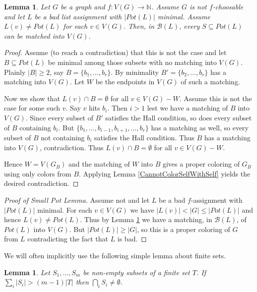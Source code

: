 \documentclass[12pt]{article}
\theoremstyle{plain}
\newtheorem{lem}[thm]{Lemma}
\theoremstyle{definition}
\theoremstyle{remark}
\newcommand{\fancy}[1]{\mathcal{#1}}
\begin{document}
\begin{lem}\label{MinPotCondition}
Let $G$ be a graph and $f\colon V(G) \rightarrow \mathbb{N}$.  Assume $G$ is not $f$-choosable and let $L$ be a bad list assignment with $|Pot(L)|$ minimal. Assume $L(v) \neq Pot(L)$ for each $v \in V(G)$. Then, in $\fancy{B}(L)$, every $S \subseteq Pot(L)$ can be matched into $V(G)$.
\end{lem}
\begin{proof}
Assume (to reach a contradiction) that this is not the case and let $B \subseteq Pot(L)$ be minimal among those subsets with no matching into $V(G)$. Plainly $|B| \geq 2$, say $B = \{b_1, \ldots, b_r\}$.  By minimality $B' = \{b_2, \ldots, b_r\}$ has a matching into $V(G)$.  Let $W$ be the endpoints in $V(G)$ of such a matching.\newline

Now we show that $L(v) \cap B = \emptyset$ for all $v \in V(G) - W$.  Assume this is not the case for some such $v$.  Say $v$ hits $b_i$.  Then $i > 1$ lest we have a matching of $B$ into $V(G)$.  Since every subset of $B'$ satisfies the Hall condition, so does every subset of $B$ containing $b_i$.  But $\{b_1, \ldots, b_{i-1}, b_{i+1}, ..., b_r\}$ has a matching as well, so every subset of $B$ not containing $b_i$ satisfies the Hall condition.  Thus $B$ has a matching into $V(G)$, contradiction.  Thus $L(v) \cap B = \emptyset$ for all $v \in V(G) - W$.\newline

Hence $W = V(G_B)$ and the matching of $W$ into $B$ gives a proper coloring of $G_B$ using only colors from $B$.  Applying Lemma \ref{CannotColorSelfWithSelf} yields the desired contradiction.
\end{proof}

\begin{proof}[Proof of Small Pot Lemma]
Assume not and let $L$ be a bad $f$-assignment with $|Pot(L)|$ minimal. For each $v \in V(G)$ we have $|L(v)| < |G| \leq |Pot(L)|$ and hence $L(v) \neq Pot(L)$.  Thus by Lemma \ref{MinPotCondition} we have a matching, in $\fancy{B}(L)$, of $Pot(L)$ into $V(G)$.  But $|Pot(L)| \geq |G|$, so this is a proper coloring of $G$ from $L$ contradicting the fact that $L$ is bad.
\end{proof}

We will often implicitly use the following simple lemma about finite sets.
\begin{lem}\label{BasicFiniteSets}
Let $S_1, \ldots, S_m$ be non-empty subsets of a finite set $T$.  If $\sum_{i} |S_i| > (m - 1)|T|$ then $\bigcap_{i} S_i \neq \emptyset$.
\end{lem}
\end{document}
